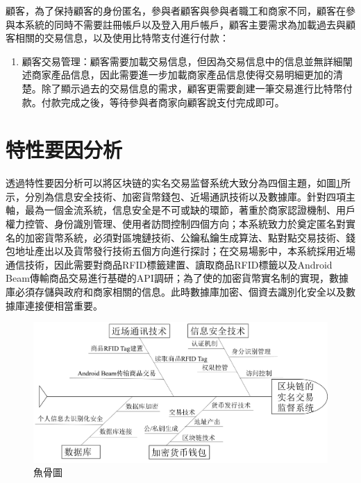 顧客，為了保持顧客的身份匿名，參與者顧客與參與者職工和商家不同，顧客在參與本系統的同時不需要註冊帳戶以及登入用戶帳戶，顧客主要需求為加載過去與顧客相關的交易信息，以及使用比特幣支付進行付款：
	\begin{enumerate}
	\item 顧客交易管理：顧客需要加載交易信息，但因為交易信息中的信息並無詳細闡述商家產品信息，因此需要進一步加載商家產品信息使得交易明細更加的清楚。除了顯示過去的交易信息的需求，顧客更需要創建一筆交易進行比特幣付款。付款完成之後，等待參與者商家向顧客說支付完成即可。
	\end{enumerate}

	\section{特性要因分析}
	透過特性要因分析可以將区块链的实名交易监督系统大致分為四個主題，如圖\ref{fish1}所示，分別為信息安全技術、加密貨幣錢包、近場通訊技術以及數據庫。針對四項主軸，最為一個金流系統，信息安全是不可或缺的環節，著重於商家認證機制、用戶權力控管、身份識別管理、使用者訪問控制四個方向；本系統致力於奠定匿名對實名的加密貨幣系統，必須對區塊鏈技術、公鑰私鑰生成算法、點對點交易技術、錢包地址產出以及貨幣發行技術五個方向進行探討；在交易場影中，本系統採用近場通信技術，因此需要對商品RFID標籤建置、讀取商品RFID標籤以及Android Beam傳輸商品交易進行基礎的API調研；為了使的加密貨幣實名制的實現，數據庫必須存儲與政府和商家相關的信息。此時數據庫加密、個資去識別化安全以及數據庫連接便相當重要。
		\begin{figure}[!htbp]
			\centering
			\includegraphics[width = 1\textwidth]{fish1.png}
			\caption{魚骨圖}\label{fish1}
		\end{figure}


